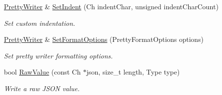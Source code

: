 \begin{DoxyCompactItemize}
\item 
\hyperlink{class_pretty_writer}{Pretty\+Writer} \& \hyperlink{class_pretty_writer_ad307b4c8d61af25042d0adcd0910c19a}{Set\+Indent} (Ch indent\+Char, unsigned indent\+Char\+Count)
\begin{DoxyCompactList}\small\item\em Set custom indentation. \end{DoxyCompactList}\item 
\hyperlink{class_pretty_writer}{Pretty\+Writer} \& \hyperlink{class_pretty_writer_a1ff9dbeff9b9c724080cb65987a41b73}{Set\+Format\+Options} (Pretty\+Format\+Options options)
\begin{DoxyCompactList}\small\item\em Set pretty writer formatting options. \end{DoxyCompactList}\item 
bool \hyperlink{class_pretty_writer_a440890a72408a150ef46edda6becdc94}{Raw\+Value} (const Ch $\ast$json, size\+\_\+t length, Type type)
\begin{DoxyCompactList}\small\item\em Write a raw J\+S\+ON value. \end{DoxyCompactList}\end{DoxyCompactItemize}
